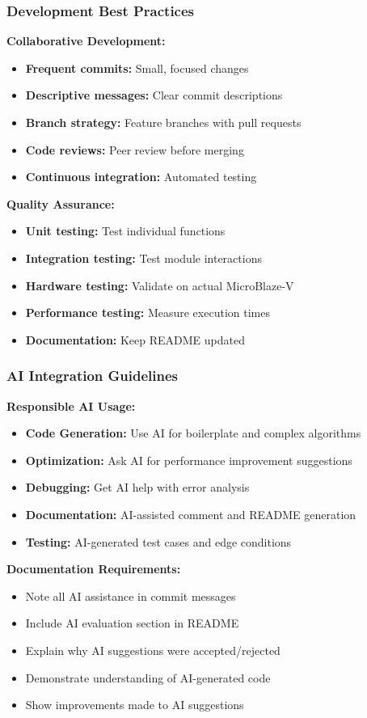 \documentclass{beamer}
\begin{document}
\begin{frame}
\frametitle{Development Best Practices}
\textbf{Collaborative Development:}
\begin{itemize}
    \item \textbf{Frequent commits:} Small, focused changes
    \item \textbf{Descriptive messages:} Clear commit descriptions
    \item \textbf{Branch strategy:} Feature branches with pull requests
    \item \textbf{Code reviews:} Peer review before merging
    \item \textbf{Continuous integration:} Automated testing
\end{itemize}

\vspace{0.5cm}
\textbf{Quality Assurance:}
\begin{itemize}
    \item \textbf{Unit testing:} Test individual functions
    \item \textbf{Integration testing:} Test module interactions
    \item \textbf{Hardware testing:} Validate on actual MicroBlaze-V
    \item \textbf{Performance testing:} Measure execution times
    \item \textbf{Documentation:} Keep README updated
\end{itemize}
\end{frame}

\begin{frame}
\frametitle{AI Integration Guidelines}
\textbf{Responsible AI Usage:}
\begin{itemize}
    \item \textbf{Code Generation:} Use AI for boilerplate and complex algorithms
    \item \textbf{Optimization:} Ask AI for performance improvement suggestions
    \item \textbf{Debugging:} Get AI help with error analysis
    \item \textbf{Documentation:} AI-assisted comment and README generation
    \item \textbf{Testing:} AI-generated test cases and edge conditions
\end{itemize}

\vspace{0.5cm}
\textbf{Documentation Requirements:}
\begin{itemize}
    \item Note all AI assistance in commit messages
    \item Include AI evaluation section in README
    \item Explain why AI suggestions were accepted/rejected
    \item Demonstrate understanding of AI-generated code
    \item Show improvements made to AI suggestions
\end{itemize}
\end{frame}
\end{document}
